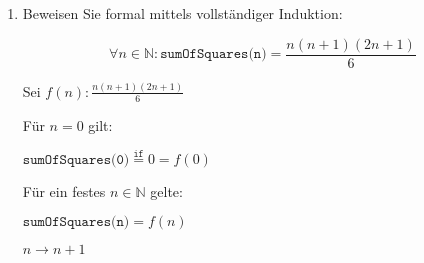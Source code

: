 \documentclass{bschlangaul-aufgabe}
\begin{document}
\begin{enumerate}


\item Beweisen Sie formal mittels vollständiger Induktion:

\begin{displaymath}
\forall n \in \mathbb{N} : \texttt{sumOfSquares(n)} =
\frac{n(n + 1)(2n + 1)}{6}
\end{displaymath}

\begin{bAntwort}
Sei $f(n): \frac{n(n + 1)(2n + 1)}{6}$

%

\bInduktionAnfang

Für $n = 0$ gilt:

$\texttt{sumOfSquares(0)} \overset{\texttt{if}}{=} 0 = f(0)$

%

\bInduktionVoraussetzung

Für ein festes $n \in \mathbb{N}$ gelte:

$\texttt{sumOfSquares(n)} = f(n)$

%

\bInduktionSchritt

$n \rightarrow n + 1$


\end{bAntwort}
\end{enumerate}
\end{document}
